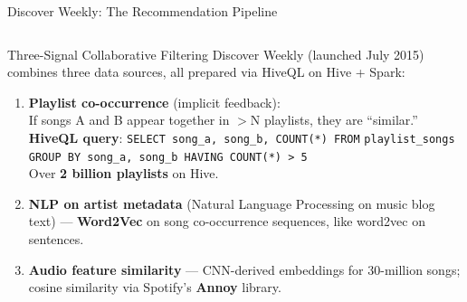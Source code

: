 \documentclass[aspectratio=169,10pt]{beamer}
\begin{document}
\begin{frame}{Discover Weekly: The Recommendation Pipeline}
  \begin{columns}[T]
      \begin{block}{Three-Signal Collaborative Filtering}
        Discover Weekly (launched July 2015) combines three data
        sources, all prepared via HiveQL on Hive + Spark:
        \begin{enumerate}
          \item \textbf{Playlist co-occurrence} (implicit feedback):\\
                If songs A and B appear together in $>$N playlists,
                they are ``similar.''
                \textbf{HiveQL query}:
                \texttt{SELECT song\_a, song\_b, COUNT(*) FROM}
                \texttt{playlist\_songs GROUP BY song\_a, song\_b
                HAVING COUNT(*) > 5}\\
                Over \textbf{2 billion playlists} on Hive.
          \item \textbf{NLP on artist metadata} (Natural Language Processing
                on music blog text) — \textbf{Word2Vec} on
                song co-occurrence sequences, like word2vec on sentences.
          \item \textbf{Audio feature similarity} — CNN-derived
                embeddings for 30-million songs; cosine similarity
                via Spotify's \textbf{Annoy} library.
        \end{enumerate}
      \end{block}


\end{columns}
\end{frame}
\end{document}
